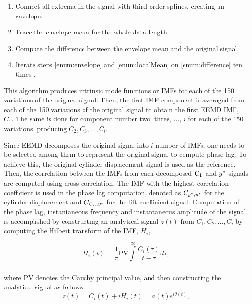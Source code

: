 \documentclass[oneside]{utmthesis}
\begin{document}
\begin{enumerate} \label{enumerate:emd}
  \item Connect all extrema in the signal with third-order splines, creating an envelope. \label{enum:envelope}
  \item Trace the envelope mean for the whole data length. \label{enum:localMean}
  \item Compute the difference between the envelope mean and the original signal. \label{enum:difference}
  \item Iterate steps \ref{enum:envelope} and \ref{enum:localMean} on \ref{enum:difference} ten times \citep{Wu2008}.
\end{enumerate}

This algorithm produces intrinsic mode functions or IMFs for each of the 150 variations of the original signal. Then, the first IMF component is averaged from each of the 150 variations of the original signal to obtain the first EEMD IMF, $C_{1}$. The same is done for component number two, three, ..., $i$ for each of the 150 variations, producing $C_{2},C_{3},\dots,C_{i}$.

Since EEMD decomposes the original signal into $i$ number of IMFs, one needs to be selected among them to represent the original signal to compute phase lag. To achieve this, the original cylinder displacement signal is used as the reference. Then, the correlation between the IMFs from each decomposed $\text{C}_{\text{L}}$ and $y^{*}$ signals are computed using cross-correlation. The IMF with the highest correlation coefficient is used in the phase lag computation, denoted as $C_{y^{*},y^{*}}$ for the cylinder displacement and $C_{\text{C}_{L},y^{*}}$ for the lift coefficient signal. Computation of the phase lag, instantaneous frequency and instantaneous amplitude of the signal is accomplished by constructing an analytical signal $z \left( t \right)$ from $C_{1},C_{2},\dots,C_{i}$ by computing the Hilbert transform of the IMF, $H_{i}$,

\begin{equation}
  H_{i} \left( t \right) = \frac{1}{\pi} \text{PV} \int\limits_{}^{\infty} \frac{C_{i} \left( \tau \right)}{t - \tau} d\tau,
  \label{eq:hilbertTransform}
\end{equation}

\noindent where PV denotes the Cauchy principal value, and then constructing the analytical signal as follows.
\begin{equation}
  z \left( t \right) = C_{i} \left( t \right) + i H_{i} \left( t \right) = a(t)e^{i\theta(t)},
  \label{eq:analiticalSignal}
\end{equation}
\end{document}
